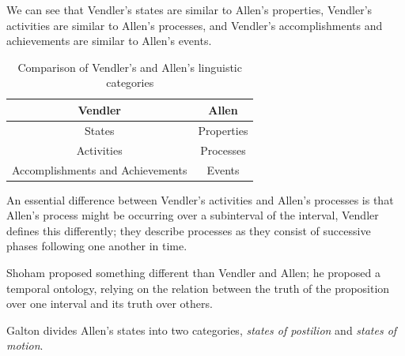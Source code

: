 We can see that Vendler's states are similar to Allen's properties, Vendler's activities are similar to Allen's processes, and Vendler's accomplishments and achievements are similar to Allen's events.

\begin{table}[h]
	\centering
	\begin{tabular}{|c|c|}
		\hline
		\textbf{Vendler}                 & \textbf{Allen} \\
		\hline
		States                           & Properties     \\
		Activities                       & Processes      \\
		Accomplishments and Achievements & Events         \\
		\hline
	\end{tabular}
	\caption{Comparison of Vendler's and Allen's linguistic categories}
	\label{tab:comparison}
\end{table}

An essential difference between Vendler's activities and Allen's processes is that Allen's process might be occurring over a subinterval of the interval,
Vendler defines this differently; they describe processes as they consist of successive phases following one another in time.


Shoham proposed something different than Vendler and Allen; he proposed a temporal ontology, relying on the relation between the truth of the proposition
over one interval and its truth over others.

Galton divides Allen's states into two categories, \textit{states of postilion} and \textit{states of motion}.
